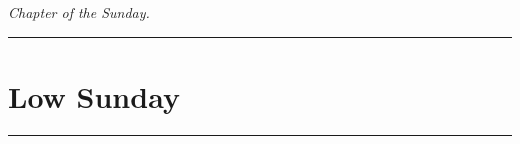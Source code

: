 {{{\begin{centering}
        \emph{Chapter of the Sunday.}

        \end{centering}%
        \vspace{-\baselineskip}
        \printsundaysaftereaster{}
    }
    \newcommand{\prehymn}{\needspace{18\baselineskip}}
    \newcommand{\magreplacement}{
        \oldneedspace{6\baselineskip}
        \noindent\begin{centering}

        \emph{Magnificat \& Collect of the Sunday.}

        \end{centering}
        \vspace{-\baselineskip}
        \printsundaysaftereaster{}
        \benedicamusdominoreference{easter}
    }
    \newcommand{\collectreplacement}{\bigskip}
    \def\postpsalmtitletwo{\needspace{8\baselineskip}}
    \def\prepsalmtwoverses{}
    \def\prepsalmtitlethree{\vspace{-0.075\baselineskip}}
    \def\prepsalmtitlefour{\vspace{-0.075\baselineskip}}
    \def\prepsalmtitlefive{\oldneedspace{12\baselineskip}}
    \def\prepsalmfive{\greseteolcustos{manual}}
    \medskip
    \hrule
}

{
\section{Low Sunday}
\label{easter1}
\printcommonvespers[1]

\def\commemorations{If the Feast of the Annunciation has been transferred to the Monday following Low Sunday, \emph{First Vespers} is commemorated as on page \pageref{annunciation-commem}.  If today is April 30, May 1, or May 2, \emph{First Vespers of St Joseph the Worker} is commemorated as follows.}
\printcommemnote{}
}

\medskip
\hrule
\medskip
{
\label{stjoseph-worker-commem}
\def\begincollectcols{\begin{parcolumns}[rulebetween,colwidths={1=0.43\linewidth}]{2}}
\def\vrlinebreak{T}

\bigskip
\benedicamusdomino{}
}

}
